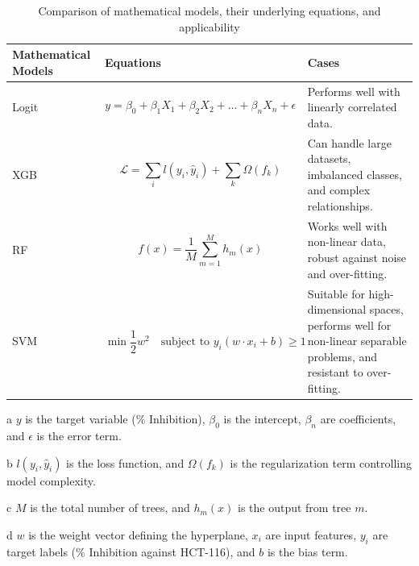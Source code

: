 \begin{table}[h]
	\centering
	\renewcommand{\arraystretch}{1.3}
	\small
	\begin{threeparttable} %
		\begin{tabular}{>{\centering\arraybackslash}p{2cm} >{\centering\arraybackslash}p{6cm} >{\centering\arraybackslash}p{6cm}}
			\hline
			\textbf{Mathematical Models} \cite{SML-formulas} & \textbf{Equations} & \textbf{Cases} \\
			\hline
			Logit \tnote{a} &  
			\begin{equation}
				y = \beta_0 + \beta_1X_1 + \beta_2X_2 + \ldots + \beta_nX_n + \epsilon
				\label{eq:logit}
			\end{equation} &  
			Performs well with linearly correlated data. \\  
			
			XGB \tnote{b} &  
			\begin{equation}
				\mathcal{L} = \sum_i l(y_i, \hat{y}_i) + \sum_k \Omega(f_k)
				\label{eq:xgboost}
			\end{equation} &  
			Can handle large datasets, imbalanced classes, and complex relationships. \\  
			
			RF \tnote{c} &  
			\begin{equation}
				f(x) = \frac{1}{M} \sum_{m=1}^M h_m(x)
				\label{eq:random}
			\end{equation} &  
			Works well with non-linear data, robust against noise and over-fitting. \\  
			
			SVM \tnote{d} &  
			\begin{equation}  
				\min \frac{1}{2} w^2 \quad \text{subject to } y_i(w \cdot x_i + b) \geq 1
				\label{eq:svm}
			\end{equation} &  
			Suitable for high-dimensional spaces, performs well for non-linear separable problems, and resistant to over-fitting. \\  
			\hline
		\end{tabular}
		\begin{tablenotes}
			\scriptsize
			\item[a] $ y $ is the target variable (\% Inhibition), $\beta_0$ is the intercept, $\beta_n$ are coefficients, and $\epsilon$ is the error term.
			\item[b] $ l(y_i, \hat{y}_i) $ is the loss function, and $ \Omega(f_k) $ is the regularization term controlling model complexity.
			\item[c] $ M $ is the total number of trees, and $ h_m(x) $ is the output from tree $ m $.
			\item[d] $ w $ is the weight vector defining the hyperplane, $ x_{i} $ are input features, $ y_{i} $ are target labels (\% Inhibition against HCT-116), and $ b $ is the bias term.
		\end{tablenotes}
	\end{threeparttable}
	\caption{Comparison of mathematical models, their underlying equations, and applicability}
	\label{tab:math_models}
\end{table}

